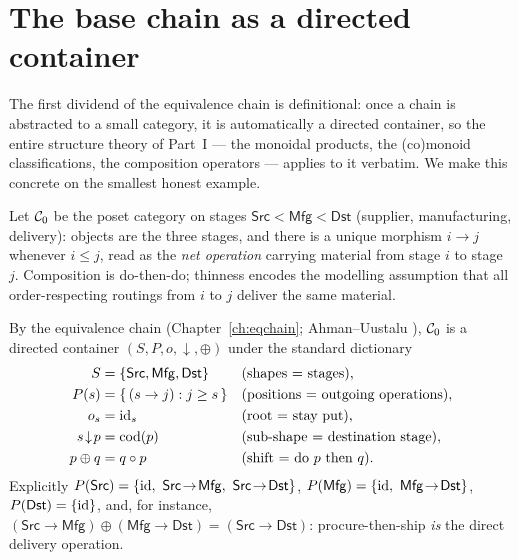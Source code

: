 \section{The base chain as a directed container}
\label{sec:supply-base}

The first dividend of the equivalence chain is definitional: once a chain is
abstracted to a small category, it is automatically a directed container, so the
entire structure theory of Part~I --- the monoidal products, the (co)monoid
classifications, the composition operators --- applies to it verbatim. We make
this concrete on the smallest honest example.

\begin{definition}
\label{def:supply-base}
Let $\mathcal{C}_0$ be the poset category on stages
$\mathsf{Src}<\mathsf{Mfg}<\mathsf{Dst}$ (supplier, manufacturing, delivery):
objects are the three stages, and there is a unique morphism $i\to j$ whenever
$i\le j$, read as the \emph{net operation} carrying material from stage $i$ to
stage $j$. Composition is do-then-do; thinness encodes the modelling assumption
that all order-respecting routings from $i$ to $j$ deliver the same material.
\end{definition}

By the equivalence chain (Chapter~\ref{ch:eqchain}; Ahman--Uustalu
\cite{AU16}), $\mathcal{C}_0$ is a directed container $(S,P,o,{\downarrow},\oplus)$ under
the standard dictionary
\[
\begin{aligned}
S &= \{\mathsf{Src},\mathsf{Mfg},\mathsf{Dst}\} && \text{(shapes $=$ stages)},\\
P(s) &= \{\,(s\to j):j\ge s\,\} && \text{(positions $=$ outgoing operations)},\\
o_s &= \mathrm{id}_s && \text{(root $=$ stay put)},\\
s\!\downarrow\! p &= \operatorname{cod}(p) && \text{(sub-shape $=$ destination stage)},\\
p\oplus q &= q\circ p && \text{(shift $=$ do $p$ then $q$)}.
\end{aligned}
\]
Explicitly $P(\mathsf{Src})=\{\id,\ \mathsf{Src}\!\to\!\mathsf{Mfg},\
\mathsf{Src}\!\to\!\mathsf{Dst}\}$,
$P(\mathsf{Mfg})=\{\id,\ \mathsf{Mfg}\!\to\!\mathsf{Dst}\}$,
$P(\mathsf{Dst})=\{\mathrm{id}\}$, and, for instance,
$(\mathsf{Src}\!\to\!\mathsf{Mfg})\oplus(\mathsf{Mfg}\!\to\!\mathsf{Dst})
=(\mathsf{Src}\!\to\!\mathsf{Dst})$: procure-then-ship \emph{is} the direct
delivery operation.

